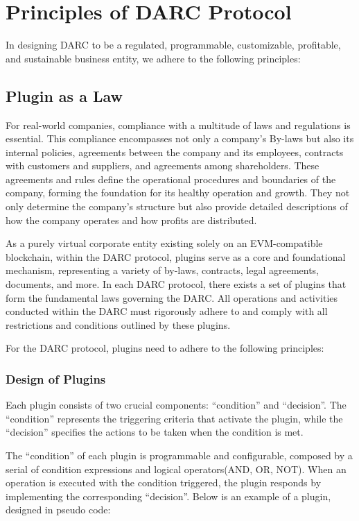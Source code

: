 \documentclass[main.tex]{subfiles}
\begin{document}
\section{Principles of DARC Protocol}

In designing DARC to be a regulated, programmable, customizable, profitable, and sustainable business entity, we adhere to the following principles:

\subsection{Plugin as a Law}

For real-world companies, compliance with a multitude of laws and regulations is essential. This compliance encompasses not only a company's By-laws but also its internal policies, agreements between the company and its employees, contracts with customers and suppliers, and agreements among shareholders. These agreements and rules define the operational procedures and boundaries of the company, forming the foundation for its healthy operation and growth. They not only determine the company's structure but also provide detailed descriptions of how the company operates and how profits are distributed.


As a purely virtual corporate entity existing solely on an EVM-compatible blockchain, within the DARC protocol, plugins serve as a core and foundational mechanism, representing a variety of by-laws, contracts, legal agreements, documents, and more. In each DARC protocol, there exists a set of plugins that form the fundamental laws governing the DARC. All operations and activities conducted within the DARC must rigorously adhere to and comply with all restrictions and conditions outlined by these plugins.

For the DARC protocol, plugins need to adhere to the following principles:

\subsubsection{Design of Plugins}

Each plugin consists of two crucial components: ``condition'' and ``decision''. The ``condition'' represents the triggering criteria that activate the plugin, while the ``decision'' specifies the actions to be taken when the condition is met. 
    
The ``condition'' of each plugin is programmable and configurable, composed by a serial of condition expressions and logical operators(AND, OR, NOT). When an operation is executed with the condition triggered, the plugin responds by implementing the corresponding ``decision''. Below is an example of a plugin, designed in pseudo code:
\end{document}
